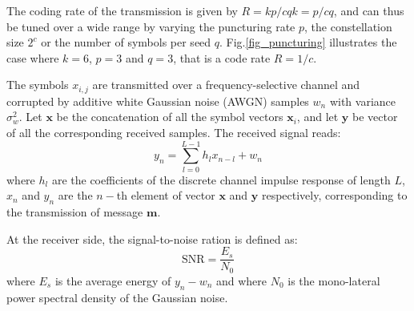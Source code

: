 \documentclass[conference]{IEEEtran}
\begin{document}
The coding rate of the transmission is given by $R=kp/cqk=p/cq$, and can thus be tuned over a wide range by varying the puncturing rate $p$, the constellation size $2^c$ or the number of symbols per seed $q$. Fig.\ref{fig_puncturing} illustrates the case where $k=6$, $p=3$ and $q=3$, that is a code rate $R=1/c$.


The symbols $x_{i,j}$ are transmitted over a frequency-selective channel and corrupted by additive white Gaussian noise (AWGN) samples $w_n$ with variance $\sigma^2_w$. Let ${\bm x}$ be the concatenation of all the symbol vectors $\bm x_i$, and let $\bm y$ be vector of all the corresponding received samples. The received signal reads:
\begin{equation}
y_n=\sum_{l=0}^{L-1} h_l x_{n-l}+w_n 
\label{equ_yn}
\end{equation}
where $h_l$ are the coefficients of the discrete channel impulse response of length $L$, $x_n$ and $y_n$ are the $n-$th element of vector $\bm x$ and $\bm y$ respectively, corresponding to the transmission of message $\bm m$.

At the receiver side, the signal-to-noise ration is defined as:
\begin{equation}
\mbox{SNR}=\frac{E_s}{N_0}
\label{equ_snr}
\end{equation}
where $E_s$ is the average energy of $y_n-w_n$ and where $N_0$ is the mono-lateral power spectral density of the Gaussian noise.

\end{document}
